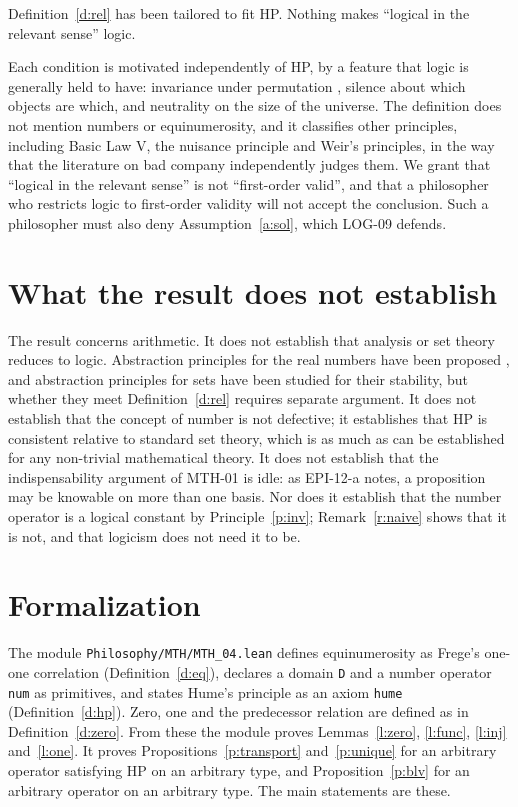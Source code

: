 \documentclass{situationist-preprint}
\begin{document}
\begin{objection}[Gerrymandering]
Definition~\ref{d:rel} has been tailored to fit HP. Nothing makes \enquote{logical in the relevant sense} logic.
\end{objection}

\begin{reply}
Each condition is motivated independently of HP, by a feature that logic is generally held to have: invariance under permutation \citep{Tarski1986,Sher1991}, silence about which objects are which, and neutrality on the size of the universe. The definition does not mention numbers or equinumerosity, and it classifies other principles, including Basic Law V, the nuisance principle and Weir's principles, in the way that the literature on bad company independently judges them. We grant that \enquote{logical in the relevant sense} is not \enquote{first-order valid}, and that a philosopher who restricts logic to first-order validity will not accept the conclusion. Such a philosopher must also deny Assumption~\ref{a:sol}, which LOG-09 defends.
\end{reply}

\section{What the result does not establish}\label{s:not}

The result concerns arithmetic. It does not establish that analysis or set theory reduces to logic. Abstraction principles for the real numbers have been proposed \citep{Hale2000}, and abstraction principles for sets have been studied for their stability, but whether they meet Definition~\ref{d:rel} requires separate argument. It does not establish that the concept of number is not defective; it establishes that HP is consistent relative to standard set theory, which is as much as can be established for any non-trivial mathematical theory. It does not establish that the indispensability argument of MTH-01 is idle: as EPI-12-a notes, a proposition may be knowable on more than one basis. Nor does it establish that the number operator is a logical constant by Principle~\ref{p:inv}; Remark~\ref{r:naive} shows that it is not, and that logicism does not need it to be.

\section{Formalization}\label{s:formal}

The module \nolinkurl{Philosophy/MTH/MTH_04.lean} defines equinumerosity as Frege's one-one correlation (Definition~\ref{d:eq}), declares a domain \texttt{D} and a number operator \texttt{num} as primitives, and states Hume's principle as an axiom \texttt{hume} (Definition~\ref{d:hp}). Zero, one and the predecessor relation are defined as in Definition~\ref{d:zero}. From these the module proves Lemmas~\ref{l:zero}, \ref{l:func}, \ref{l:inj} and~\ref{l:one}. It proves Propositions~\ref{p:transport} and~\ref{p:unique} for an arbitrary operator satisfying HP on an arbitrary type, and Proposition~\ref{p:blv} for an arbitrary operator on an arbitrary type. The main statements are these.
\end{document}
